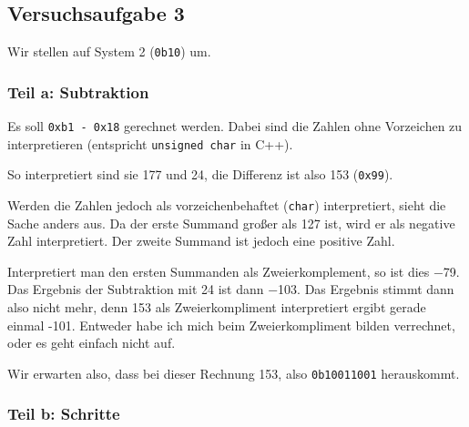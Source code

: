 \subsection{Versuchsaufgabe 3}

Wir stellen auf System 2 (\texttt{0b10}) um.

\subsubsection{Teil a: Subtraktion}

Es soll \texttt{0xb1 - 0x18} gerechnet werden. Dabei sind die Zahlen ohne
Vorzeichen zu interpretieren (entspricht \texttt{unsigned char} in C++).

So interpretiert sind sie 177 und 24, die Differenz ist also 153
(\texttt{0x99}).

Werden die Zahlen jedoch als vorzeichenbehaftet (\texttt{char}) interpretiert,
sieht die Sache anders aus. Da der erste Summand großer als 127 ist, wird er
als negative Zahl interpretiert. Der zweite Summand ist jedoch eine positive
Zahl.

Interpretiert man den ersten Summanden als Zweierkomplement, so ist dies
\num{-79}. Das Ergebnis der Subtraktion mit 24 ist dann \num{-103}. Das
Ergebnis stimmt dann also nicht mehr, denn 153 als Zweierkompliment
interpretiert ergibt gerade einmal -101. Entweder habe ich mich beim
Zweierkompliment bilden verrechnet, oder es geht einfach nicht auf.

Wir erwarten also, dass bei dieser Rechnung 153, also \texttt{0b10011001}
herauskommt.

\subsubsection{Teil b: Schritte}

